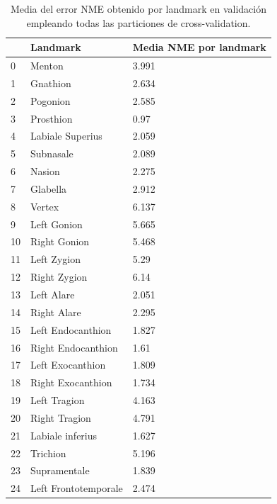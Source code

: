         \begin{table}[!ht]
            \centering
            \caption{Media del error NME obtenido por landmark en validación empleando todas las particiones de cross-validation.}
            \begin{tabular}{|l|l|l|}
            \hline
                ~ & Landmark & Media NME por landmark \\ \hline
                0 & Menton & 3.991 \\ \hline
                1 & Gnathion & 2.634 \\ \hline
                2 & Pogonion & 2.585 \\ \hline
                3 & Prosthion & 0.97 \\ \hline
                4 & Labiale Superius & 2.059 \\ \hline
                5 & Subnasale & 2.089 \\ \hline
                6 & Nasion & 2.275 \\ \hline
                7 & Glabella & 2.912 \\ \hline
                8 & Vertex & 6.137 \\ \hline
                9 & Left Gonion & 5.665 \\ \hline
                10 & Right Gonion & 5.468 \\ \hline
                11 & Left Zygion & 5.29 \\ \hline
                12 & Right Zygion & 6.14 \\ \hline
                13 & Left Alare & 2.051 \\ \hline
                14 & Right Alare & 2.295 \\ \hline
                15 & Left Endocanthion & 1.827 \\ \hline
                16 & Right Endocanthion & 1.61 \\ \hline
                17 & Left Exocanthion & 1.809 \\ \hline
                18 & Right Exocanthion & 1.734 \\ \hline
                19 & Left Tragion & 4.163 \\ \hline
                20 & Right Tragion & 4.791 \\ \hline
                21 & Labiale inferius & 1.627 \\ \hline
                22 & Trichion & 5.196 \\ \hline
                23 & Supramentale & 1.839 \\ \hline
                24 & Left Frontotemporale & 2.474 \\ \hline

\end{tabular}
\end{table}
